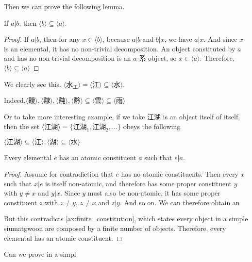 Then we can prove the following lemma. 
\begin{lemma}[X-系 is a Siumatgwoon]\label{lem:hais-of-sets-are-siumatgwoons}
    If $a|b$, then $ \langle b \rangle \subseteq \langle a \rangle$.
\end{lemma}
\begin{proof}
    If $a|b$, then for any $x\in \langle b \rangle$, because $a|b$ and $b|x$, we have $a|x$. And since $x$ is an elemental, it has no non-trivial decomposition. An object constituted by $a$ and has no non-trivial decomposition is an $a$-系 object, so $x \in \langle a \rangle$. Therefore, $\langle b \rangle \subseteq \langle a \rangle$
\end{proof}

We clearly see this. $
\langle \text{水}_\text{工} \rangle = \langle \text{江} \rangle \subseteq
\langle \text{水} \rangle$. 

Indeed,$\langle \text{靉} \rangle, \langle \text{霴} \rangle, \langle \text{霕} \rangle, \langle \text{霒} \rangle \subseteq \langle \text{雲} \rangle \subseteq \langle \text{雨} \rangle$

Or to take more interesting example, if we take $江湖$ is an object itself of itself, then the set $\langle \text{江湖} \rangle = \{\text{江湖}_{1}, \text{江湖}_{2}, \ldots\}$ obeys the following 


$\langle \text{江湖} \rangle \subseteq \langle \text{江} \rangle,  \langle \text{湖} \rangle \subseteq \langle \text{水} \rangle$

\begin{lemma}\label{lem:every-elemental-has-an-atomic-constituent}
    Every elemental $e$ has an atomic constituent $a$ such that $e|a$.
\end{lemma}
\begin{proof}
    Assume for contradiction that $e$ has no atomic constituents. Then every $x$ such that $x|e$ is itself non-atomic, and therefore has some proper constituent $y$ with $y \neq x$ and $y|x$. Since $y$ must also be non-atomic, it has some proper constituent $z$ with $z \neq y$, $z \neq x$ and $z|y$. And so on. We can therefore obtain an 
    
    
    But this contradicts \ref{ax:finite_constitution}, which states every object in a simple siumatgwoon are composed by a finite number of objects. Therefore, every elemental has an atomic constituent.
\end{proof}


Can we prove in a simpl

